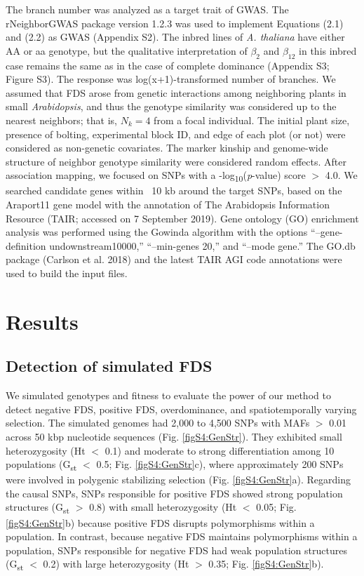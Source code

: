\documentclass[12pt,]{article}
\begin{document}
The branch number was analyzed as a target trait of GWAS. The rNeighborGWAS package version 1.2.3 \citep{sato2019neighbor} was used to implement Equations (2.1) and (2.2) as GWAS (Appendix S2). The inbred lines of \textit{A. thaliana} have either AA or aa genotype, but the qualitative interpretation of $\beta_2$ and $\beta_{12}$ in this inbred case remains the same as in the case of complete dominance (Appendix S3; Figure S3). The response was log(x+1)-transformed number of branches. We assumed that FDS arose from genetic interactions among neighboring plants in small \textit{Arabidopsis}, and thus the genotype similarity was considered up to the nearest neighbors; that is, $N_k=4$ from a focal individual. The initial plant size, presence of bolting, experimental block ID, and edge of each plot (or not) were considered as non-genetic covariates. The marker kinship and genome-wide structure of neighbor genotype similarity were considered random effects. After association mapping, we focused on SNPs with a -log\textsubscript{10}(\textit{p}-value) score $>$ 4.0. We searched candidate genes within ~10 kb around the target SNPs, based on the Araport11 gene model with the annotation of The Arabidopsis Information Resource (TAIR; accessed on 7 September 2019). Gene ontology (GO) enrichment analysis was performed using the Gowinda algorithm \citep{kofler2012gowinda} with the options “--gene-definition undownstream10000,” “--min-genes 20,” and “--mode gene.” The GO.db package (Carlson et al. 2018) and the latest TAIR AGI code annotations were used to build the input files.


\section{Results}

\subsection{Detection of simulated FDS}
We simulated genotypes and fitness to evaluate the power of our method to detect negative FDS, positive FDS, overdominance, and spatiotemporally varying selection. The simulated genomes had 2,000 to 4,500 SNPs with MAFs $>$ 0.01 across 50 kbp nucleotide sequences (Fig. \ref{figS4:GenStr}). They exhibited small heterozygosity (Ht $<$ 0.1) and moderate to strong differentiation among 10 populations (G\textsubscript{st} $<$ 0.5; Fig. \ref{figS4:GenStr}c), where approximately 200 SNPs were involved in polygenic stabilizing selection (Fig. \ref{figS4:GenStr}a). Regarding the causal SNPs, SNPs responsible for positive FDS showed strong population structures (G\textsubscript{st} $>$ 0.8) with small heterozygosity (Ht $<$ 0.05; Fig. \ref{figS4:GenStr}b) because positive FDS disrupts polymorphisms within a population. In contrast, because negative FDS maintains polymorphisms within a population, SNPs responsible for negative FDS had weak population structures (G\textsubscript{st} $<$ 0.2) with large heterozygosity (Ht $>$ 0.35; Fig. \ref{figS4:GenStr}b).
\end{document}

